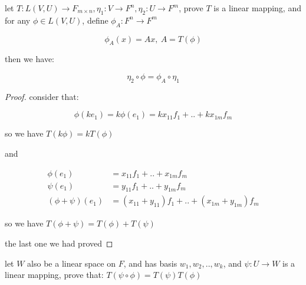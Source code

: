 \begin{exercise}
    let $T: L(V, U) \to F_{m \times n}, \eta_1: V \to F^{n}, \eta_2: U \to F^m$,
    prove $T$ is a linear mapping, and for any $\phi \in L(V,U)$, define $\phi_A: F^n \to F^m$

    \[
        \phi_A(x) = Ax,\: A = T(\phi)
    \]

    then we have:

    \[
        \eta_2 \circ \phi = \phi_A \circ \eta_1
    \]
\end{exercise}

\begin{proof}
    consider that:

    \[
        \phi(ke_1) = k\phi(e_1) = kx_{11}f_1 + .. + kx_{1m}f_m
    \]

    so we have $T(k\phi) = kT(\phi)$

    and

    \begin{align*}
        \phi(e_1) &= x_{11}f_1 + .. + x_{1m}f_m \\
        \psi(e_1) &= y_{11}f_1 + .. + y_{1m}f_m \\
        (\phi+\psi)(e_1) &= (x_{11} + y_{11})f_1 + .. + (x_{1m} + y_{1m})f_m 
    \end{align*}

    so we have $T(\phi + \psi) = T(\phi) + T(\psi)$

    the last one we had proved
\end{proof}

\begin{exercise}
    let $W$ also be a linear space on $F$, and has basis $w_1,w_2,..,w_k$, and $\psi: U \to W$
    is a linear mapping, prove that:
    $T(\psi \circ \phi) = T(\psi) T(\phi)$
\end{exercise}

